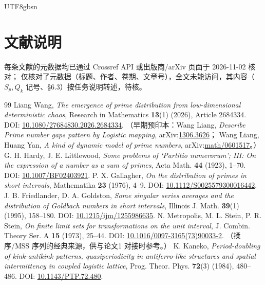 \documentclass[11pt,a4paper]{article}
\theoremstyle{plain}
\theoremstyle{definition}
\begin{document}
\begin{CJK}{UTF8}{gbsn}
\section*{文献说明}
每条文献的元数据均已通过 Crossref API 或出版商/arXiv 页面于 2026-11-02 核对；
\cite{Wang26} 仅核对了元数据（标题、作者、卷期、文章号），全文未能访问，其内容（$S_p,Q_k$ 记号、\S6.3）按任务说明转述，待核。

\begin{thebibliography}{99}
 Liang Wang, \emph{The emergence of prime distribution from low-dimensional deterministic chaos},
Research in Mathematics \textbf{13}(1) (2026), Article 2684334. DOI: \url{10.1080/27684830.2026.2684334}.
（早期预印本：Wang Liang, \emph{Describe Prime number gaps pattern by Logistic mapping}, arXiv:\url{1306.3626}；
Wang Liang, Huang Yan, \emph{A kind of dynamic model of prime numbers}, arXiv:\url{math/0601517}。）
 G. H. Hardy, J. E. Littlewood, \emph{Some problems of `Partitio numerorum'; III: On the expression of a number as a sum of primes},
Acta Math. \textbf{44} (1923), 1--70. DOI: \url{10.1007/BF02403921}.
 P. X. Gallagher, \emph{On the distribution of primes in short intervals}, Mathematika \textbf{23} (1976), 4--9.
DOI: \url{10.1112/S0025579300016442}.
 J. B. Friedlander, D. A. Goldston, \emph{Some singular series averages and the distribution of Goldbach numbers in short intervals},
Illinois J. Math. \textbf{39}(1) (1995), 158--180. DOI: \url{10.1215/ijm/1255986635}.
 N. Metropolis, M. L. Stein, P. R. Stein, \emph{On finite limit sets for transformations on the unit interval},
J. Combin. Theory Ser. A \textbf{15} (1973), 25--44. DOI: \url{10.1016/0097-3165(73)90033-2}.
（揉序/MSS 序列的经典来源，供与论文1 对接时参考。）
 K. Kaneko, \emph{Period-doubling of kink-antikink patterns, quasiperiodicity in antiferro-like structures and spatial intermittency in coupled logistic lattice},
Prog. Theor. Phys. \textbf{72}(3) (1984), 480--486. DOI: \url{10.1143/PTP.72.480}.
\end{thebibliography}

\end{CJK}
\end{document}
